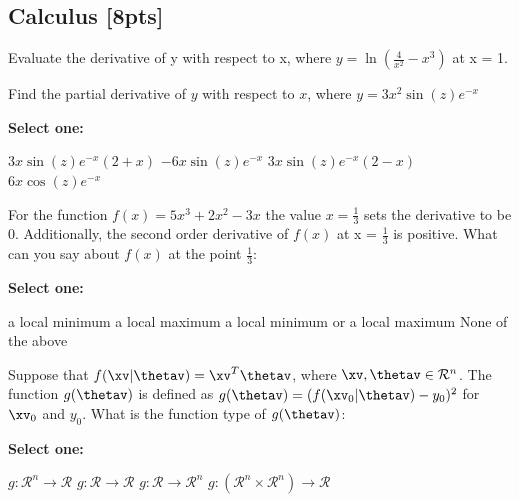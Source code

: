 \documentclass[11pt,addpoints,answers]{exam}
\numberwithin{equation}{section} %
\numberwithin{figure}{section} %
\numberwithin{table}{section} %
\begin{document}
\subsection{Calculus [8pts]}
\begin{questions}



    \question[2] Evaluate the derivative of y with respect to x, where $y = \ln(\frac{4}{x^2}-x^3)$ at x = 1.

    \begin{tcolorbox}[fit,height=1cm, width=2cm, blank, borderline={1pt}{-2pt},nobeforeafter]
    \end{tcolorbox}


    \question[2] Find the partial derivative of $y$ with respect to $x$, where $y= 3x^2 \sin(z) e^{-x}$

    \textbf{Select one:}
    \begin{checkboxes}{}
        \choice $3x\sin(z) e^{-x}(2+x)$
        \choice $-6x\sin(z) e^{-x}$
        \choice $3x\sin(z) e^{-x}(2-x)$
        \choice $6x\cos(z)e^{-x}$
    \end{checkboxes}


    \question[2] For the function $f(x)= 5x^3 +2x^2-3x$ the value $x=\frac{1}{3}$ sets the derivative to be 0. Additionally, the second order derivative of $f(x)$ at x = $\frac{1}{3}$ is positive. What can you say about $f(x)$ at the point $\frac{1}{3}$:

    \textbf{Select one:}
    \begin{checkboxes}{}
        \choice a local minimum
        \choice a local maximum
        \choice a local minimum or a local maximum
        \choice None of the above
    \end{checkboxes}

    
    \question[2] Suppose that $f(\xv|\thetav)=\xv^T\thetav$, where $\xv, \thetav \in \mathcal{R}^n$. The function $g(\thetav)$ is defined as $g(\thetav) = (f(\xv_0|\thetav) - y_0)^2$ for $\xv_0$ and $y_0$. What is the function type of $g(\thetav)$:

    \textbf{Select one:}
    \begin{checkboxes}{}
        \choice $g: \mathcal{R}^n \rightarrow \mathcal{R}$
        \choice $g: \mathcal{R} \rightarrow \mathcal{R}$
        \choice $g: \mathcal{R} \rightarrow \mathcal{R}^n$
        \choice $g: (\mathcal{R}^n \times \mathcal{R}^n) \rightarrow \mathcal{R}$
    \end{checkboxes}

    
    \clearpage
\end{questions}
\end{document}

